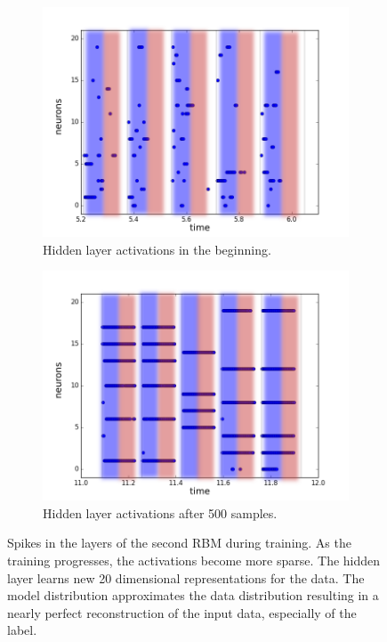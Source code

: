 \begin{figure}[h!]
	\begin{subfigure}[t]{.32\textwidth}
  		\centering
  		\includegraphics[width=.9\linewidth]{imgs/7x7/20076_h.png}
  		\caption{Hidden layer activations in the beginning.}
  		\label{fig:sub2}
	\end{subfigure}
	\begin{subfigure}[t]{.32\textwidth}
  		\centering
  		\includegraphics[width=.9\linewidth]{imgs/7x7/20946_h.png}
  		\caption{Hidden layer  activations after 500 samples.}
  		\label{fig:sub2}
	\end{subfigure}
	\caption[Spikes in the layers of the second RBM during training.]{Spikes in the layers of the second RBM during training. As the training progresses, the activations become more sparse. The hidden layer learns new 20 dimensional representations for the data. The model distribution approximates the data distribution resulting in a nearly perfect reconstruction of the input data, especially of the label.}
	\label{fig:stripesspl2}
\end{figure}


